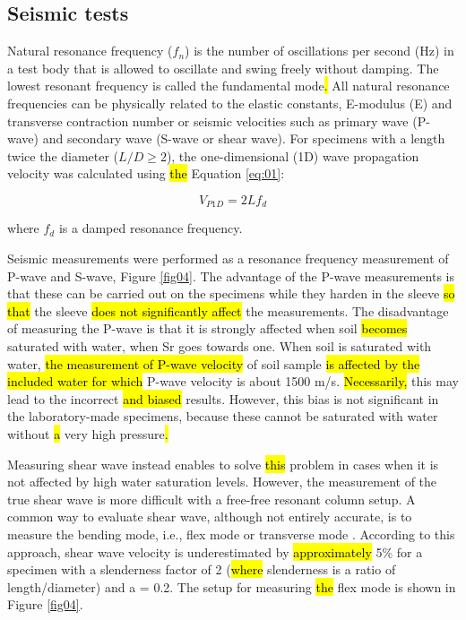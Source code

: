\documentclass[final,3p,times,onecolumn,authoryear]{elsarticle}
\begin{document}
\subsection{Seismic tests}

Natural resonance frequency ($f_n$)\hl{ }is the number of oscillations per second (Hz) in a test body that is allowed to oscillate and swing freely without damping. The lowest resonant frequency is called the fundamental mode\hl{. }All natural resonance frequencies can be physically related to the elastic constants, E-modulus (E) and transverse contraction number or seismic velocities such as primary wave (P-wave) and secondary wave (S-wave or shear wave). For specimens with a length twice the diameter ($L/D\geq2$), the one-dimensional (1D) wave propagation velocity was calculated using \hl{the }Equation \ref{eq:01}:

\begin{equation}\label{eq:01}
	V_{P1D} =2Lf_d
\end{equation}

where $f_d$ is a damped resonance frequency. 

Seismic measurements were performed as a resonance frequency measurement of P-wave and S-wave, Figure \ref{fig04}. The advantage of the P-wave measurements is that these can be carried out on the specimens while they harden in the sleeve \hl{so that} the sleeve \hl{does not significantly affect }the measurements. The disadvantage of measuring the P-wave is that it is strongly affected when soil \hl{becomes }saturated with water, when Sr goes towards one. When soil is saturated with water, \hl{the measurement of P-wave velocity} of soil sample \hl{is affected by the included water for which} P-wave velocity\hl{ }is about 1500 m/s. \hl{Necessarily, }this may lead to the incorrect \hl{and biased }results. However, this bias is not significant in the laboratory-made specimens, because these cannot be saturated with water without \hl{a} very high pressure\hl{.} 

Measuring\hl{ }shear wave instead enables to solve \hl{this }problem in cases when it is not affected by high water saturation levels. However, the measurement of the true shear wave is more difficult with a free-free resonant column setup. A common\hl{ }way to evaluate shear wave, although not entirely accurate, is to measure the bending mode, i.e., flex mode or transverse mode \citep{VERASTEGUIFLORES2015943}. According to this approach, shear wave velocity is underestimated by \hl{approximately} 5\% for a specimen with a slenderness factor of 2 (\hl{where }slenderness is a ratio of length/diameter) and a = 0.2. The setup for measuring \hl{the }flex mode is shown in Figure \ref{fig04}.
\end{document}
